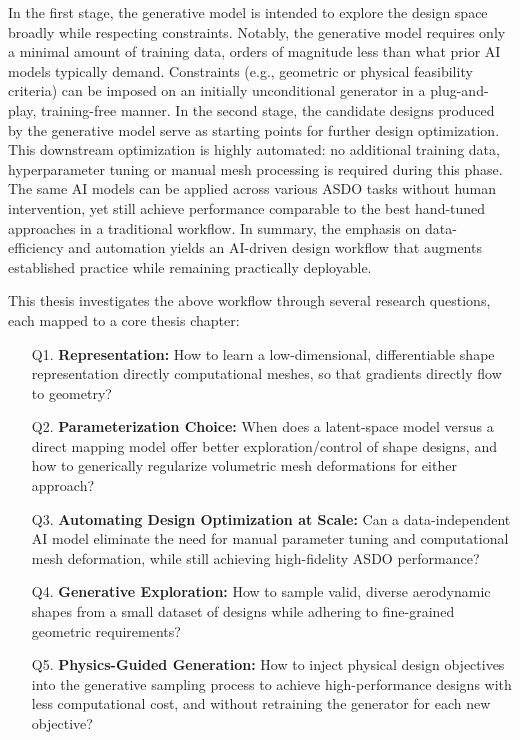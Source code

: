 In the first stage, the generative model is intended to explore the design space broadly while respecting constraints. Notably, the generative model requires only a minimal amount of training data, orders of magnitude less than what prior AI models typically demand. Constraints (e.g., geometric or physical feasibility criteria) can be imposed on an initially unconditional generator in a plug-and-play, training-free manner.
In the second stage, the candidate designs produced by the generative model serve as starting points for further design optimization. This downstream optimization is highly automated: no additional training data, hyperparameter tuning or manual mesh processing is required during this phase. The same AI models can be applied across various ASDO tasks without human intervention, yet still achieve performance comparable to the best hand-tuned approaches in a traditional workflow. 
In summary, the emphasis on data-efficiency and automation yields an AI-driven design workflow that augments established practice while remaining practically deployable.

This thesis investigates the above workflow through several research questions, each mapped to a core thesis chapter:
\begin{itemize}
    \item[Q1.] \textbf{Representation: } How to learn a low-dimensional, differentiable shape representation directly computational meshes, so that gradients directly flow to geometry?
    \item[Q2.] \textbf{Parameterization Choice: } When does a latent-space model versus a direct mapping model offer better exploration/control of shape designs, and how to generically regularize volumetric mesh deformations for either approach?
    \item[Q3.] \textbf{Automating Design Optimization at Scale: } Can a data-independent AI model eliminate the need for manual parameter tuning and computational mesh deformation, while still achieving high-fidelity ASDO performance?
    \item[Q4.] \textbf{Generative Exploration:} How to sample valid, diverse aerodynamic shapes from a small dataset of designs while adhering to fine-grained geometric requirements?
    \item[Q5.] \textbf{Physics-Guided Generation:} How to inject physical design objectives into the generative sampling process to achieve high-performance designs with less computational cost, and without retraining the generator for each new objective?
\end{itemize}

